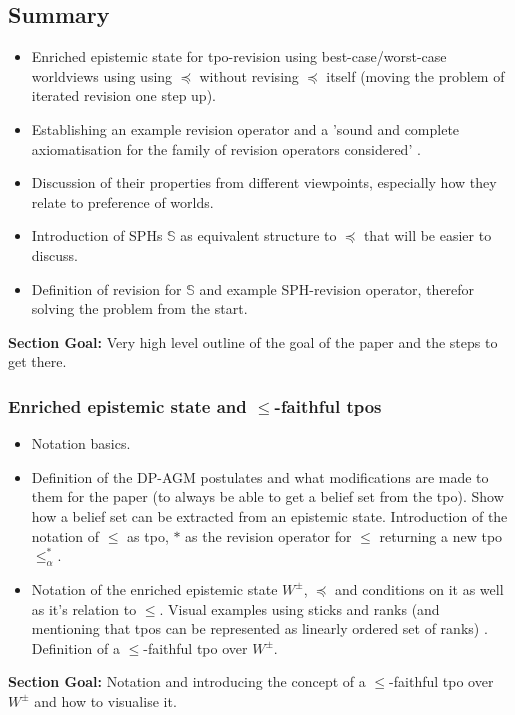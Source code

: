 \documentclass[11pt]{article}
\begin{document}
\subsection{Summary}
\begin{itemize}
    \item Enriched epistemic state for tpo-revision using best-case/worst-case worldviews using using $\preceq$ without revising $\preceq$ itself (moving the problem of iterated revision one step up).
    \item Establishing an example revision operator and a 'sound and complete axiomatisation for the family of revision operators considered' \cite{Booth2011}.
    \item Discussion of their properties from different viewpoints, especially how they relate to preference of worlds.
    \item Introduction of SPHs $\mathds{S}$ as equivalent structure to $\preceq$ that will be easier to discuss.
    \item Definition of revision for $\mathds{S}$ and example SPH-revision operator, therefor solving the problem from the start. 
\end{itemize}
\textbf{Section Goal:} Very high level outline of the goal of the paper and the steps to get there.

\subsubsection{Enriched epistemic state and $\leq$-faithful tpos}
\begin{itemize}
    \item Notation basics.
    \item Definition of the DP-AGM postulates and what modifications are made to them for the paper (to always be able to get a belief set from the tpo). Show how a belief set can be extracted from an epistemic state. Introduction of the notation of $\leq$ as tpo, $\ast$ as the revision operator for $\leq$ returning a new tpo $\leq^{\ast}_{\alpha}$. 
    \item Notation of the enriched epistemic state $W^{\pm}$, $\preceq$ and conditions on it as well as it's relation to $\leq$. Visual examples using sticks \cite{Booth2011} and ranks (and mentioning that tpos can be represented as linearly ordered set of ranks) \cite{Booth2006}. Definition of a $\leq$-faithful tpo over $W^{\pm}$.
\end{itemize}
\textbf{Section Goal:} Notation and introducing the concept of a $\leq$-faithful tpo over $W^{\pm}$ and how to visualise it.
\end{document}
